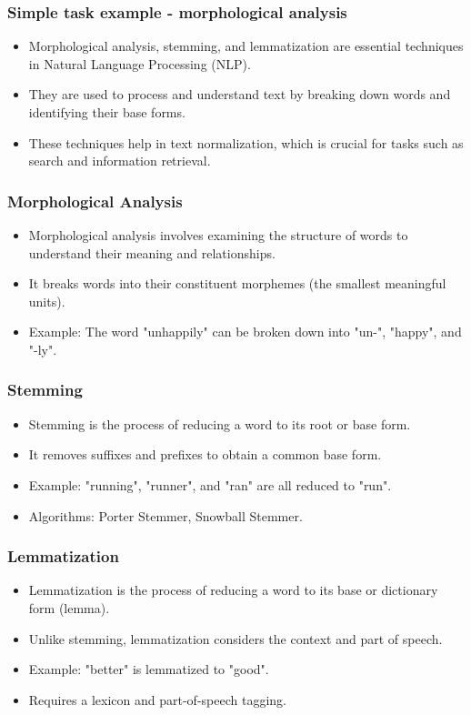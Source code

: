 \documentclass{beamer}
\begin{document}
\begin{frame}
\frametitle{Simple task example - morphological analysis}
\begin{itemize}
    \item Morphological analysis, stemming, and lemmatization are essential techniques in Natural Language Processing (NLP).
    \item They are used to process and understand text by breaking down words and identifying their base forms.
    \item These techniques help in text normalization, which is crucial for tasks such as search and information retrieval.
\end{itemize}
\end{frame}

\begin{frame}
\frametitle{Morphological Analysis}
\begin{itemize}
    \item Morphological analysis involves examining the structure of words to understand their meaning and relationships.
    \item It breaks words into their constituent morphemes (the smallest meaningful units).
    \item Example: The word "unhappily" can be broken down into "un-", "happy", and "-ly".
\end{itemize}
\end{frame}

\begin{frame}
\frametitle{Stemming}
\begin{itemize}
    \item Stemming is the process of reducing a word to its root or base form.
    \item It removes suffixes and prefixes to obtain a common base form.
    \item Example: "running", "runner", and "ran" are all reduced to "run".
    \item Algorithms: Porter Stemmer, Snowball Stemmer.
\end{itemize}
\end{frame}

\begin{frame}
\frametitle{Lemmatization}
\begin{itemize}
    \item Lemmatization is the process of reducing a word to its base or dictionary form (lemma).
    \item Unlike stemming, lemmatization considers the context and part of speech.
    \item Example: "better" is lemmatized to "good".
    \item Requires a lexicon and part-of-speech tagging.
\end{itemize}
\end{frame}
\end{document}
